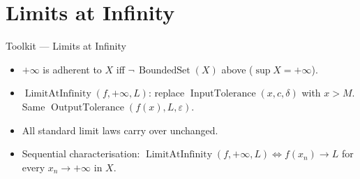 
\section{Limits at Infinity}

\begin{toolkitbox}{Toolkit --- Limits at Infinity}
\begin{itemize}
  \item $+\infty$ is adherent to $X$ iff $\neg\,\operatorname{BoundedSet}(X)$
    above ($\sup X=+\infty$).
  \item $\operatorname{LimitAtInfinity}(f,+\infty,L)$: replace
    $\operatorname{InputTolerance}(x,c,\delta)$ with $x>M$.
    Same $\operatorname{OutputTolerance}(f(x),L,\varepsilon)$.
  \item All standard limit laws carry over unchanged.
  \item Sequential characterisation: $\operatorname{LimitAtInfinity}
    (f,+\infty,L)\iff f(x_n)\to L$ for every $x_n\to+\infty$ in $X$.
\end{itemize}
\end{toolkitbox}




